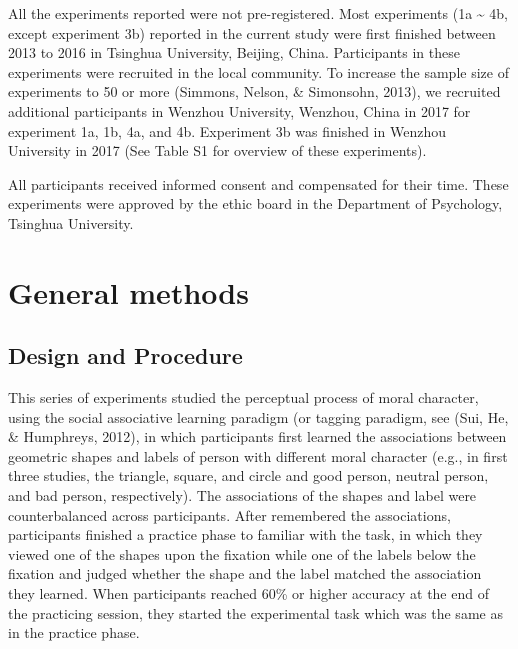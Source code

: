 \documentclass[
  man]{apa6}
\begin{document}
All the experiments reported were not pre-registered. Most experiments (1a \textasciitilde{} 4b, except experiment 3b) reported in the current study were first finished between 2013 to 2016 in Tsinghua University, Beijing, China. Participants in these experiments were recruited in the local community. To increase the sample size of experiments to 50 or more (Simmons, Nelson, \& Simonsohn, 2013), we recruited additional participants in Wenzhou University, Wenzhou, China in 2017 for experiment 1a, 1b, 4a, and 4b. Experiment 3b was finished in Wenzhou University in 2017 (See Table S1 for overview of these experiments).

All participants received informed consent and compensated for their time. These experiments were approved by the ethic board in the Department of Psychology, Tsinghua University.

\hypertarget{general-methods}{%
\section{General methods}\label{general-methods}}

\hypertarget{design-and-procedure}{%
\subsection{Design and Procedure}\label{design-and-procedure}}

This series of experiments studied the perceptual process of moral character, using the social associative learning paradigm (or tagging paradigm, see (Sui, He, \& Humphreys, 2012), in which participants first learned the associations between geometric shapes and labels of person with different moral character (e.g., in first three studies, the triangle, square, and circle and good person, neutral person, and bad person, respectively). The associations of the shapes and label were counterbalanced across participants. After remembered the associations, participants finished a practice phase to familiar with the task, in which they viewed one of the shapes upon the fixation while one of the labels below the fixation and judged whether the shape and the label matched the association they learned. When participants reached 60\% or higher accuracy at the end of the practicing session, they started the experimental task which was the same as in the practice phase.
\end{document}

